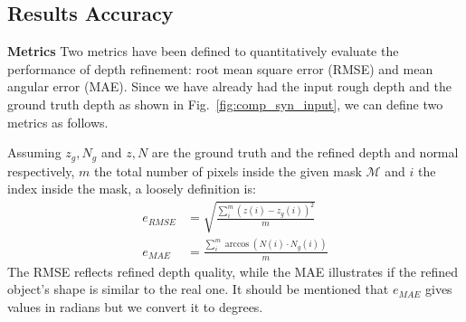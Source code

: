 \subsection{Results Accuracy}
\textbf{Metrics}
Two metrics have been defined to quantitatively evaluate the performance of depth refinement: root mean square error (RMSE) and mean angular error (MAE).
Since we have already had the input rough depth and the ground truth depth as shown in Fig.~\ref{fig:comp_syn_input}, we can define two metrics as follows.

Assuming $z_g, N_g$ and $z, N$ are the ground truth and the refined depth and normal respectively, $m$ the total number of pixels inside the given mask $\mathcal{M}$ and $i$ the index inside the mask, a loosely definition is: 
\begin{align}
    e_{RMSE} &= \sqrt{\frac{\sum\limits_{i}^{m}{(z(i) - z_g(i))^2}}{m}}\\
    e_{MAE} &= \frac{\sum\limits_{i}^{m} \arccos (N(i) \cdot N_g(i))}{m}
\end{align}
The RMSE reflects refined depth quality, while the MAE illustrates if the refined object's shape is similar to the real one. 
It should be mentioned that $e_{MAE}$ gives values in radians but we convert it to degrees.

